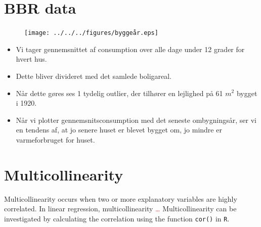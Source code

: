 
\section{BBR data}

\begin{figure}
    \centering
    \texttt{[image: ../../../figures/byggeår.eps]}
    \caption{}
    \label{fig: byggeår}
\end{figure}

\begin{itemize}
    \item Vi tager gennemsnittet af consumption over alle dage under 12 grader for hvert hus.
    \item Dette bliver divideret med det samlede boligareal.
    \item Når dette gøres ses 1 tydelig outlier, der tilhører en lejlighed på 61 $m^2$ bygget i 1920.
    \item Når vi plotter gennemsnitsconsumption med det seneste ombygningsår, ser vi en tendens af, at jo senere huset er blevet bygget om, jo mindre er varmeforbruget for huset.
\end{itemize}    

\section{Multicollinearity}
Multicollinearity occurs when two or more explanatory variables are highly correlated. In linear regression, multicollinearity \textcolor{red}{\dots} Multicollinearity can be investigated by calculating the correlation using the function \texttt{cor()} in \texttt{R}.\\

